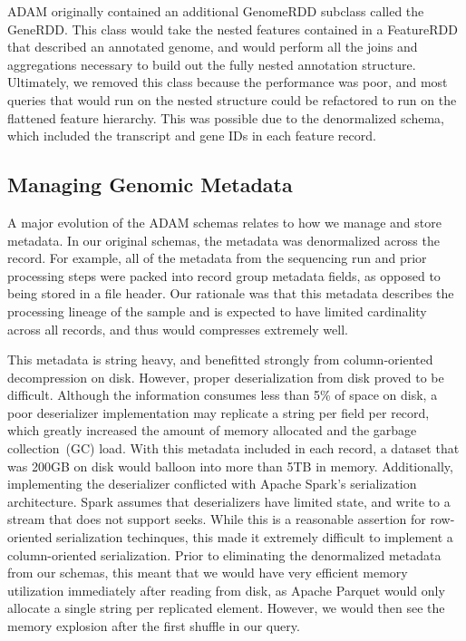 \documentclass[phd]{ucbthesis}
\begin{document}
{ADAM} originally contained an additional {GenomeRDD} subclass
called the {GeneRDD}. This class would take the nested features contained
in a {FeatureRDD} that described an annotated genome, and would perform
all the joins and aggregations necessary to build out the fully nested
annotation structure. Ultimately, we removed this class because the performance
was poor, and most queries that would run on the nested structure could be
refactored to run on the flattened feature hierarchy. This was possible due to
the denormalized schema, which included the transcript and gene IDs in each
feature record.

\subsection{Managing Genomic Metadata}
\label{sec:metadata}

A major evolution of the {ADAM} schemas relates to how we manage and
store metadata. In our original schemas, the metadata was denormalized across the
record. For example, all of the metadata from the sequencing run and prior
processing steps were packed into record group metadata fields, as opposed to
being stored in a file header. Our rationale was that this metadata describes
the processing lineage of the sample and is expected to have limited cardinality
across all records, and thus would compresses extremely well.

This metadata is string heavy, and benefitted strongly from column-oriented
decompression on disk. However, proper deserialization from disk proved to be
difficult. Although the information consumes less than 5\% of space on disk, a
poor deserializer implementation may replicate a string per field per record,
which greatly increased the amount of memory allocated and the garbage
collection~(GC) load. With this metadata included in each record, a dataset
that was 200GB on disk would balloon into more than 5TB in memory. Additionally,
implementing the deserializer conflicted with {Apache Spark}'s
serialization architecture. {Spark} assumes that deserializers have
limited state, and write to a stream that does not support seeks. While this is
a reasonable assertion for row-oriented serialization techinques, this made it
extremely difficult to implement a column-oriented serialization. Prior to
eliminating the denormalized metadata from our schemas, this meant that we would
have very efficient memory utilization immediately after reading from disk, as
{Apache Parquet} would only allocate a single string per replicated
element. However, we would then see the memory explosion after the first shuffle
in our query.
\end{document}
